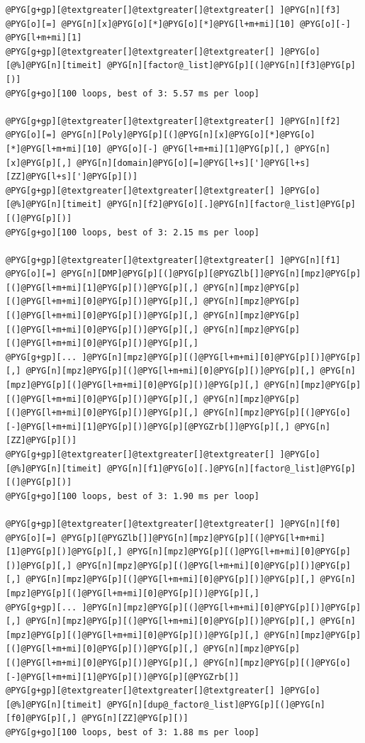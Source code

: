 \begin{Verbatim}[commandchars=@\[\]]
@PYG[g+gp][@textgreater[]@textgreater[]@textgreater[] ]@PYG[n][f3] @PYG[o][=] @PYG[n][x]@PYG[o][*]@PYG[o][*]@PYG[l+m+mi][10] @PYG[o][-] @PYG[l+m+mi][1]
@PYG[g+gp][@textgreater[]@textgreater[]@textgreater[] ]@PYG[o][@%]@PYG[n][timeit] @PYG[n][factor@_list]@PYG[p][(]@PYG[n][f3]@PYG[p][)]
@PYG[g+go][100 loops, best of 3: 5.57 ms per loop]

@PYG[g+gp][@textgreater[]@textgreater[]@textgreater[] ]@PYG[n][f2] @PYG[o][=] @PYG[n][Poly]@PYG[p][(]@PYG[n][x]@PYG[o][*]@PYG[o][*]@PYG[l+m+mi][10] @PYG[o][-] @PYG[l+m+mi][1]@PYG[p][,] @PYG[n][x]@PYG[p][,] @PYG[n][domain]@PYG[o][=]@PYG[l+s][']@PYG[l+s][ZZ]@PYG[l+s][']@PYG[p][)]
@PYG[g+gp][@textgreater[]@textgreater[]@textgreater[] ]@PYG[o][@%]@PYG[n][timeit] @PYG[n][f2]@PYG[o][.]@PYG[n][factor@_list]@PYG[p][(]@PYG[p][)]
@PYG[g+go][100 loops, best of 3: 2.15 ms per loop]

@PYG[g+gp][@textgreater[]@textgreater[]@textgreater[] ]@PYG[n][f1] @PYG[o][=] @PYG[n][DMP]@PYG[p][(]@PYG[p][@PYGZlb[]]@PYG[n][mpz]@PYG[p][(]@PYG[l+m+mi][1]@PYG[p][)]@PYG[p][,] @PYG[n][mpz]@PYG[p][(]@PYG[l+m+mi][0]@PYG[p][)]@PYG[p][,] @PYG[n][mpz]@PYG[p][(]@PYG[l+m+mi][0]@PYG[p][)]@PYG[p][,] @PYG[n][mpz]@PYG[p][(]@PYG[l+m+mi][0]@PYG[p][)]@PYG[p][,] @PYG[n][mpz]@PYG[p][(]@PYG[l+m+mi][0]@PYG[p][)]@PYG[p][,]
@PYG[g+gp][... ]@PYG[n][mpz]@PYG[p][(]@PYG[l+m+mi][0]@PYG[p][)]@PYG[p][,] @PYG[n][mpz]@PYG[p][(]@PYG[l+m+mi][0]@PYG[p][)]@PYG[p][,] @PYG[n][mpz]@PYG[p][(]@PYG[l+m+mi][0]@PYG[p][)]@PYG[p][,] @PYG[n][mpz]@PYG[p][(]@PYG[l+m+mi][0]@PYG[p][)]@PYG[p][,] @PYG[n][mpz]@PYG[p][(]@PYG[l+m+mi][0]@PYG[p][)]@PYG[p][,] @PYG[n][mpz]@PYG[p][(]@PYG[o][-]@PYG[l+m+mi][1]@PYG[p][)]@PYG[p][@PYGZrb[]]@PYG[p][,] @PYG[n][ZZ]@PYG[p][)]
@PYG[g+gp][@textgreater[]@textgreater[]@textgreater[] ]@PYG[o][@%]@PYG[n][timeit] @PYG[n][f1]@PYG[o][.]@PYG[n][factor@_list]@PYG[p][(]@PYG[p][)]
@PYG[g+go][100 loops, best of 3: 1.90 ms per loop]

@PYG[g+gp][@textgreater[]@textgreater[]@textgreater[] ]@PYG[n][f0] @PYG[o][=] @PYG[p][@PYGZlb[]]@PYG[n][mpz]@PYG[p][(]@PYG[l+m+mi][1]@PYG[p][)]@PYG[p][,] @PYG[n][mpz]@PYG[p][(]@PYG[l+m+mi][0]@PYG[p][)]@PYG[p][,] @PYG[n][mpz]@PYG[p][(]@PYG[l+m+mi][0]@PYG[p][)]@PYG[p][,] @PYG[n][mpz]@PYG[p][(]@PYG[l+m+mi][0]@PYG[p][)]@PYG[p][,] @PYG[n][mpz]@PYG[p][(]@PYG[l+m+mi][0]@PYG[p][)]@PYG[p][,]
@PYG[g+gp][... ]@PYG[n][mpz]@PYG[p][(]@PYG[l+m+mi][0]@PYG[p][)]@PYG[p][,] @PYG[n][mpz]@PYG[p][(]@PYG[l+m+mi][0]@PYG[p][)]@PYG[p][,] @PYG[n][mpz]@PYG[p][(]@PYG[l+m+mi][0]@PYG[p][)]@PYG[p][,] @PYG[n][mpz]@PYG[p][(]@PYG[l+m+mi][0]@PYG[p][)]@PYG[p][,] @PYG[n][mpz]@PYG[p][(]@PYG[l+m+mi][0]@PYG[p][)]@PYG[p][,] @PYG[n][mpz]@PYG[p][(]@PYG[o][-]@PYG[l+m+mi][1]@PYG[p][)]@PYG[p][@PYGZrb[]]
@PYG[g+gp][@textgreater[]@textgreater[]@textgreater[] ]@PYG[o][@%]@PYG[n][timeit] @PYG[n][dup@_factor@_list]@PYG[p][(]@PYG[n][f0]@PYG[p][,] @PYG[n][ZZ]@PYG[p][)]
@PYG[g+go][100 loops, best of 3: 1.88 ms per loop]
\end{Verbatim}
